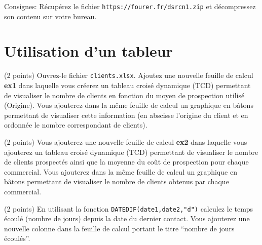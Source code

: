 \documentclass[a4paper,8pt]{article}
\begin{document}
% 
Consignes: R\'ecup\'erez le fichier \verb?https://fourer.fr/dsrcn1.zip? et d\'ecompressez son contenu sur votre bureau.
\vspace{-0.3cm}
\section{Utilisation d'un tableur}
%
\exost (2 points) Ouvrez-le fichier \verb?clients.xlsx?.
Ajoutez une nouvelle feuille de calcul {\bf ex1} dans laquelle vous cr\'eerez un tableau crois\'e dynamique (TCD) 
permettant de visualiser le nombre de clients en fonction du moyen de prospection utilis\'e (Origine).
Vous ajouterez dans la m\^eme feuille de calcul un graphique en b\^atons permettant de visualiser cette information (en abscisse
l'origine du client et en ordonn\'ee le nombre correspondant de clients).

\exost (2 points) Vous ajouterez une nouvelle feuille de calcul {\bf ex2} dans laquelle vous ajouterez un tableau crois\'e dynamique (TCD)
permettant de visualiser le nombre de clients prospect\'es ainsi que la moyenne du co\^ut de prospection pour chaque commercial.
Vous ajouterez dans la m\^eme feuille de calcul un graphique en b\^atons permettant de visualiser le nombre de clients 
obtenus par chaque commercial.

\exost (2 points) En utilisant la fonction \verb?DATEDIF(date1,date2,"d")? calculez le temps \'ecoul\'e (nombre de jours)
depuis la date du dernier contact. Vous ajouterez une nouvelle colonne dans la feuille de calcul portant le titre ``nombre de jours \'ecoul\'es''.
\end{document}
